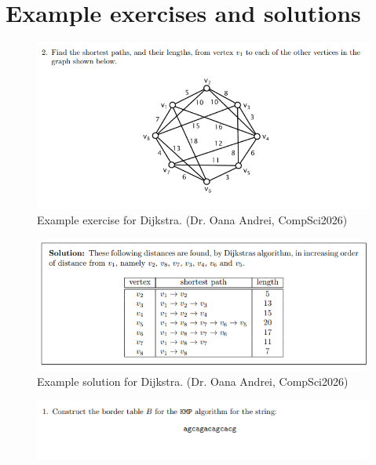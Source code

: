 \documentclass{l4proj}
\begin{document}
\begin{appendices}
\label{chap:appendices}
\chapter{Example exercises and solutions}
\label{chap:ex_ex}

\begin{figure}[h]
    \centering
    \includegraphics[width=0.9\linewidth]{images/dijkstra_example_exercise}    

    \caption{Example exercise for Dijkstra. (Dr. Oana Andrei, CompSci2026)}
    \label{fig:dijkstra_example_exercise} 
\end{figure}

\begin{figure}[h]
    \centering
    \includegraphics[width=0.9\linewidth]{images/dijkstra_example_solution}    

    \caption{Example solution for Dijkstra. (Dr. Oana Andrei, CompSci2026)}
    \label{fig:dijkstra_example_solution} 
\end{figure}

\begin{figure}[h]
    \centering
    \includegraphics[width=0.9\linewidth]{images/kmp_example_exercise}    


\end{figure}
\end{appendices}
\end{document}
